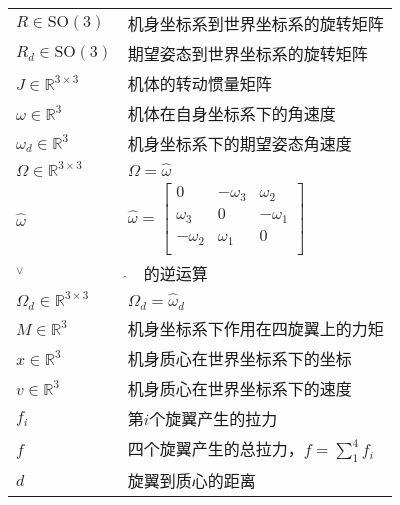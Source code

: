 
\begin{nomenclature*}
\label{chap:symb}

\begin{longtable}{ll}
  $R \in \text{SO}(3)$                            & 机身坐标系到世界坐标系的旋转矩阵     \\
  $R_d \in \text{SO}(3)$                          & 期望姿态到世界坐标系的旋转矩阵   \\
  $J\in \mathbb{R}^{3 \times 3}$           & 机体的转动惯量矩阵           \\
  $\omega \in \mathbb{R}^{3}$              & 机体在自身坐标系下的角速度         \\
  $\omega_d \in \mathbb{R}^{3}$            & 机身坐标系下的期望姿态角速度 \\
  $\Omega  \in  \mathbb{R}^{3 \times 3}$   & $\Omega=\widehat \omega $   \\
  $\widehat \omega$ &
  $\widehat \omega =\begin{bmatrix}
    0 &-\omega_3  &\omega_2  \\
    \omega_3 & 0 & -\omega_1 \\
    -\omega_2 & \omega_1 & 0 \\
    \end{bmatrix}$   \\

    ${}^\vee$ & $\widehat{} \quad$的逆运算 \\
  $\Omega_d  \in  \mathbb{R}^{3 \times 3}$ & $\Omega_d=\widehat \omega_d$     \\
  $M\in \mathbb{R}^{3}$       & 机身坐标系下作用在四旋翼上的力矩                 \\  
  $x\in \mathbb{R}^{3}$ & 机身质心在世界坐标系下的坐标\\
  $v\in \mathbb{R}^{3}$ & 机身质心在世界坐标系下的速度\\
  $f_i$ & 第$i$个旋翼产生的拉力 \\
  $f$  & 四个旋翼产生的总拉力，$f=\sum_{1}^{4} f_i$\\
  $d$ & 旋翼到质心的距离 \\
\end{longtable}

\end{nomenclature*}
